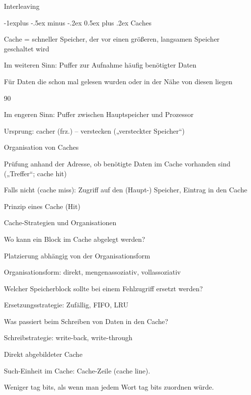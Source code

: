 \documentclass[10pt,landscape]{article}
\makeatletter
\renewcommand{\subsection}{\@startsection{subsection}{2}{0mm}%
                                {-1explus -.5ex minus -.2ex}%
                                {0.5ex plus .2ex}%
                                {\normalfont\normalsize\bfseries}}
\makeatother
\begin{document}
\begin{multicols}{3}
  Interleaving
  
  \subsection{ Caches}
  \begin{itemize*}
    \item Cache = schneller Speicher, der vor einen größeren, langsamen Speicher geschaltet wird
    \item Im weiteren Sinn: Puffer zur Aufnahme häufig benötigter Daten
    \item Für Daten die schon mal gelesen wurden oder in der Nähe von diesen liegen
    \item 90%
    \item Im engeren Sinn: Puffer zwischen Hauptspeicher und Prozessor
    \item Ursprung: cacher (frz.) – verstecken („versteckter Speicher“)
    \item Organisation von Caches
    \item Prüfung anhand der Adresse, ob benötigte Daten im Cache vorhanden sind („Treffer“; cache hit)
    \item Falls nicht (cache miss): Zugriff auf den (Haupt-) Speicher, Eintrag in den Cache
    \item Prinzip eines Cache (Hit) %
    \item Cache-Strategien und Organisationen
    \item Wo kann ein Block im Cache abgelegt werden?
    \item Platzierung abhängig von der Organisationsform
    \item Organisationsform: direkt, mengenassoziativ, vollassoziativ
    \item Welcher Speicherblock sollte bei einem Fehlzugriff ersetzt werden?
    \item Ersetzungsstrategie: Zufällig, FIFO, LRU
    \item Was passiert beim Schreiben von Daten in den Cache?
    \item Schreibstrategie: write-back, write-through
    \item Direkt abgebildeter Cache
    \item Such-Einheit im Cache: Cache-Zeile (cache line).
    \item Weniger tag bits, als wenn man jedem Wort tag bits zuordnen würde.

\end{itemize*}
\end{multicols}
\end{document}

